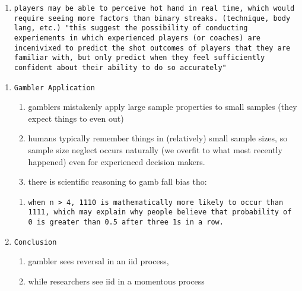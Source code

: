 \documentclass[12pt,twoside]{dukestatscithesis}
\providecommand{\tightlist}{%
  \setlength{\itemsep}{0pt}\setlength{\parskip}{0pt}}
\theoremstyle{definition}
\theoremstyle{definition}
\theoremstyle{definition}
\theoremstyle{remark}
\begin{document}
\begin{enumerate}
\begin{enumerate}
\begin{verbatim}
\end{verbatim}
  \item
\begin{verbatim}
players may be able to perceive hot hand in real time, which would require seeing more factors than binary streaks. (technique, body lang, etc.) "this suggest the possibility of conducting experiements in which experienced players (or coaches) are incenivixed to predict the shot outcomes of players that they are familiar with, but only predict when they feel sufficiently confident about their ability to do so accurately"
\end{verbatim}
  \end{enumerate}
\end{enumerate}
\begin{enumerate}
\def\labelenumi{\Alph{enumi}.}
\setcounter{enumi}{3}
\item
\begin{verbatim}
Gambler Application
\end{verbatim}
  \begin{enumerate}
  \def\labelenumii{\arabic{enumii}.}
  \tightlist
  \item
    gamblers mistakenly apply large sample properties to small samples
    (they expect things to even out)
  \item
    humans typically remember things in (relatively) small sample sizes,
    so sample size neglect occurs naturally (we overfit to what most
    recently happened) even for experienced decision makers.
  \item
    there is scientific reasoning to gamb fall bias tho:
  \end{enumerate}
  \begin{enumerate}
  \def\labelenumii{\alph{enumii}.}
  \item
\begin{verbatim}
when n > 4, 1110 is mathematically more likely to occur than 1111, which may explain why people believe that probability of 0 is greater than 0.5 after three 1s in a row.
\end{verbatim}
  \end{enumerate}
\item
\begin{verbatim}
Conclusion
\end{verbatim}
  \begin{enumerate}
  \def\labelenumii{\arabic{enumii}.}
  \tightlist
  \item
    gambler sees reversal in an iid process,
  \item
    while researchers see iid in a momentous process
  \end{enumerate}
\end{enumerate}
\end{document}
